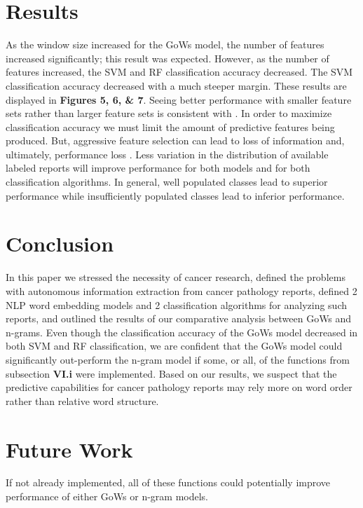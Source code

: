 \documentclass[twoside,twocolumn]{article}
\begin{document}
\section{Results}
As the window size increased for the GoWs model, the number of features increased significantly; this result was expected. However, as the number of features increased, the SVM and RF classification accuracy decreased. The SVM classification accuracy decreased with a much steeper margin. These results are displayed in \textbf{Figures 5, 6, \& 7}. Seeing better performance with smaller feature sets rather than larger feature sets is consistent with \cite{basu2003support}. In order to maximize classification accuracy we must limit the amount of predictive features being produced. But, aggressive feature selection can lead to loss of information and, ultimately, performance loss \cite{joachims1998text}. Less variation in the distribution of available labeled reports will improve performance for both models and for both classification algorithms. In general, well populated classes lead to superior performance while insufficiently populated classes lead to inferior performance.



\section{Conclusion}
In this paper we stressed the necessity of cancer research, defined the problems with autonomous information extraction from cancer pathology reports, defined 2 NLP word embedding models and 2 classification algorithms for analyzing such reports, and outlined the results of our comparative analysis between GoWs and n-grams. Even though the classification accuracy of the GoWs model decreased in both SVM and RF classification, we are confident that the GoWs model could significantly out-perform the n-gram model if some, or all, of the functions from subsection \textbf{VI.i} were implemented. Based on our results, we suspect that the predictive capabilities for cancer pathology reports may rely more on word order rather than relative word structure. 


\section{Future Work}
If not already implemented, all of these functions could potentially improve performance of either GoWs or n-gram models.
\end{document}
